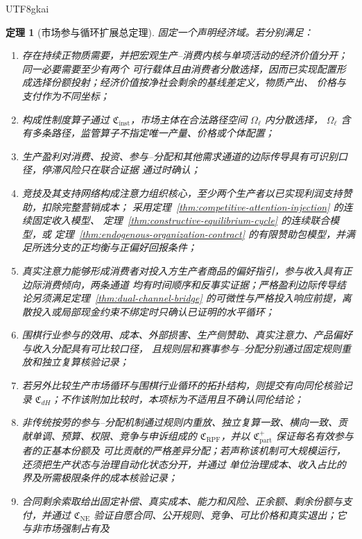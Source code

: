 \documentclass[12pt,a4paper,openany]{report}
\newtheorem{theorem}{定理}[chapter]
\begin{document}
\begin{CJK*}{UTF8}{gkai}
\begin{theorem}[市场参与循环扩展总定理]
\label{thm:market-participation-synthesis}
固定一个声明经济域。若分别满足：
\begin{enumerate}[label=\textnormal{M\arabic*:},leftmargin=3.5em]
  \item 存在持续正物质需要，并把宏观生产--消费内核与单项活动的经济价值分开；同一必要需要至少有两个
  可行载体且由消费者分散选择，因而已实现配置形成选择份额投射；经济价值按净社会剩余的基线差定义，物质产出、
  价格与支付作为不同坐标；
  \item 构成性制度算子通过 \(\mathfrak C_{\mathrm{inst}}\)，市场主体在合法路径空间 \(\Omega_\ell\) 内分散选择，
  \(\Omega_\ell\) 含有多条路径，监管算子不指定唯一产量、价格或个体配置；
  \item 生产盈利对消费、投资、参与--分配和其他需求通道的边际传导具有可识别口径，停滞风险只在联合证据
  通过时确认；
  \item 竞技及其支持网络构成注意力组织核心，至少两个生产者以已实现利润支持赞助，扣除完整营销成本；
  采用定理~\ref{thm:competitive-attention-injection} 的连续固定收入模型、
  定理~\ref{thm:constructive-equilibrium-cycle} 的连续联合模型，或
  定理~\ref{thm:endogenous-organization-contract} 的有限赞助包模型，并满足所选分支的正均衡与正偏好回报条件；
  \item 真实注意力能够形成消费者对投入方生产者商品的偏好指引，参与收入具有正边际消费倾向，两条通道
  均有时间顺序和反事实证据；严格盈利边际传导结论另须满足定理~\ref{thm:dual-channel-bridge} 的可微性与严格投入响应前提，离散投入或局部现金约束不绑定时只确认已证明的水平循环；
  \item 围棋行业参与的效用、成本、外部损害、生产侧赞助、真实注意力、产品偏好与收入分配具有可比较口径，
  且规则层和赛事参与--分配分别通过固定规则重放和独立复算核验记录；
  \item 若另外比较生产市场循环与围棋行业循环的拓扑结构，则提交有向同伦核验记录
  \(\mathfrak C_{dH}\)；不作该附加比较时，本项标为不适用且不确认同伦结论；
  \item 非传统按劳的参与--分配机制通过规则内重放、独立复算一致、横向一致、贡献单调、预算、权限、竞争与申诉组成的
  \(\mathfrak C_{\mathrm{RPF}}\)，并以 \(\mathfrak C_{\mathrm{part}}^+\) 保证每名有效参与者的正基本份额及
  可比贡献的严格差异分配；若声称该机制可大规模运行，还须把生产状态与治理自动化状态分开，并通过
  单位治理成本、收入占比的界及所需极限条件的成本核验记录；
  \item 合同剩余索取给出固定补偿、真实成本、能力和风险、正余额、剩余份额与支付，并通过
  \(\mathfrak C_{\mathrm{NE}}\) 验证自愿合同、公开规则、竞争、可比价格和真实退出；它与非市场强制占有及

\end{enumerate}
\end{theorem}
\end{CJK*}
\end{document}
